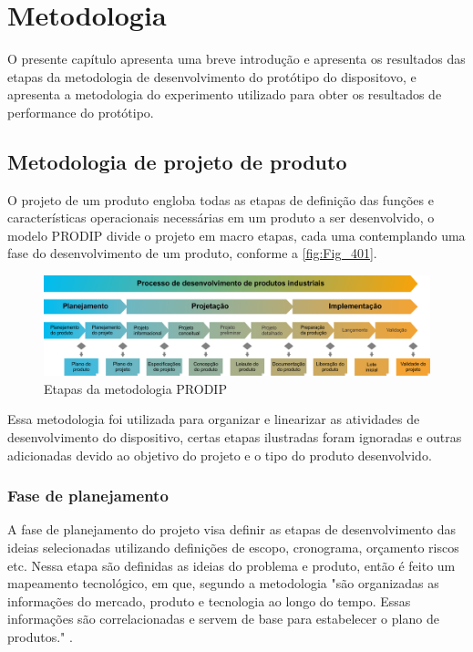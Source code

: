


\chapter{Metodologia}\label{cap:Metodologia}

O presente capítulo apresenta uma breve introdução e apresenta os resultados das etapas da metodologia de desenvolvimento do protótipo do dispositovo, e apresenta a metodologia do experimento utilizado para obter os resultados de performance do protótipo.

\section{Metodologia de projeto de produto}

O projeto de um produto engloba todas as etapas de definição das funções e características operacionais necessárias em um produto a ser desenvolvido, o modelo PRODIP divide o projeto em macro etapas, cada uma contemplando uma fase do desenvolvimento de um produto, conforme a \autoref{fig:Fig_401}.

\begin{figure}[htb]
	\caption{\label{fig:Fig_401}Etapas da metodologia PRODIP}
	\begin{center}
		\includegraphics[width=\textwidth]{images/img401.png}
	\end{center}
\end{figure}

Essa metodologia foi utilizada para organizar e linearizar as atividades de desenvolvimento do dispositivo, certas etapas ilustradas foram ignoradas e outras adicionadas devido ao objetivo do projeto e o tipo do produto desenvolvido.

\subsection{Fase de planejamento}

A fase de planejamento do projeto visa definir as etapas de desenvolvimento das ideias selecionadas utilizando definições de escopo, cronograma, orçamento riscos etc. Nessa etapa são definidas as ideias do problema e produto, então é feito um mapeamento tecnológico, em que, segundo a metodologia "são organizadas as informações do mercado, produto e tecnologia ao longo do tempo. Essas informações são correlacionadas e servem de base para estabelecer o plano de produtos." \autocite{PRODIP}.

